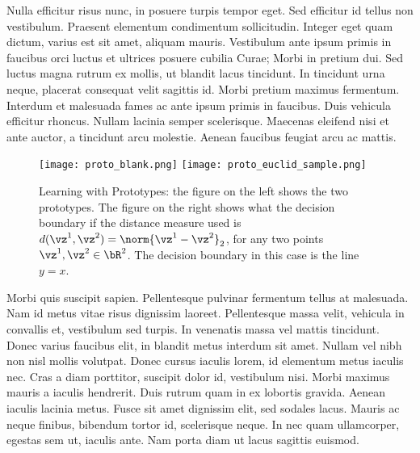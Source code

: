 \documentclass[a4paper,11pt]{article}
\begin{document}
\begin{mlsolution}
Nulla efficitur risus nunc, in posuere turpis tempor eget. Sed efficitur id tellus non vestibulum. Praesent elementum condimentum sollicitudin. Integer eget quam dictum, varius est sit amet, aliquam mauris. Vestibulum ante ipsum primis in faucibus orci luctus et ultrices posuere cubilia Curae; Morbi in pretium dui. Sed luctus magna rutrum ex mollis, ut blandit lacus tincidunt. In tincidunt urna neque, placerat consequat velit sagittis id. Morbi pretium maximus fermentum. Interdum et malesuada fames ac ante ipsum primis in faucibus. Duis vehicula efficitur rhoncus. Nullam lacinia semper scelerisque. Maecenas eleifend nisi et ante auctor, a tincidunt arcu molestie. Aenean faucibus feugiat arcu ac mattis.
\begin{figure}[th]%
\centering
\texttt{[image: proto\_blank.png]}%
\hfill
\texttt{[image: proto\_euclid\_sample.png]}%
\caption{Learning with Prototypes: the figure on the left shows the two prototypes. The figure on the right shows what the decision boundary if the distance measure used is $d(\vz^1,\vz^2) = \norm{\vz^1-\vz^2}_2$, for any two points $\vz^1,\vz^2 \in \bR^2$. The decision boundary in this case is the line $y = x$.}%
\label{fig:proto}%
\end{figure}
Morbi quis suscipit sapien. Pellentesque pulvinar fermentum tellus at malesuada. Nam id metus vitae risus dignissim laoreet. Pellentesque massa velit, vehicula in convallis et, vestibulum sed turpis. In venenatis massa vel mattis tincidunt. Donec varius faucibus elit, in blandit metus interdum sit amet. Nullam vel nibh non nisl mollis volutpat. Donec cursus iaculis lorem, id elementum metus iaculis nec. Cras a diam porttitor, suscipit dolor id, vestibulum nisi. Morbi maximus mauris a iaculis hendrerit. Duis rutrum quam in ex lobortis gravida. Aenean iaculis lacinia metus. Fusce sit amet dignissim elit, sed sodales lacus. Mauris ac neque finibus, bibendum tortor id, scelerisque neque. In nec quam ullamcorper, egestas sem ut, iaculis ante. Nam porta diam ut lacus sagittis euismod. 
\end{mlsolution}
\end{document}
